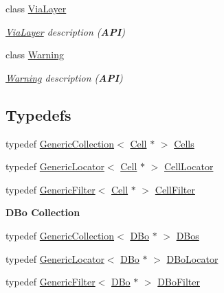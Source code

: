 \begin{DoxyCompactItemize}
class \mbox{\hyperlink{classHurricane_1_1ViaLayer}{Via\+Layer}}
\begin{DoxyCompactList}\small\item\em \mbox{\hyperlink{classHurricane_1_1ViaLayer}{Via\+Layer}} description ({\bfseries A\+PI}) \end{DoxyCompactList}\item 
class \mbox{\hyperlink{classHurricane_1_1Warning}{Warning}}
\begin{DoxyCompactList}\small\item\em \mbox{\hyperlink{classHurricane_1_1Warning}{Warning}} description ({\bfseries A\+PI}) \end{DoxyCompactList}\end{DoxyCompactItemize}
\subsection*{Typedefs}
\begin{DoxyCompactItemize}
\item 
typedef \mbox{\hyperlink{classHurricane_1_1GenericCollection}{Generic\+Collection}}$<$ \mbox{\hyperlink{classHurricane_1_1Cell}{Cell}} $\ast$ $>$ \mbox{\hyperlink{namespaceHurricane_a8b4ab14b26f36f43d83a50294410b44a}{Cells}}
\item 
typedef \mbox{\hyperlink{classHurricane_1_1GenericLocator}{Generic\+Locator}}$<$ \mbox{\hyperlink{classHurricane_1_1Cell}{Cell}} $\ast$ $>$ \mbox{\hyperlink{namespaceHurricane_abd99adab3b5944a4d1ace3d0b0b34f57}{Cell\+Locator}}
\item 
typedef \mbox{\hyperlink{classHurricane_1_1GenericFilter}{Generic\+Filter}}$<$ \mbox{\hyperlink{classHurricane_1_1Cell}{Cell}} $\ast$ $>$ \mbox{\hyperlink{namespaceHurricane_addb0e9cd376680ecea4966516694b799}{Cell\+Filter}}
\end{DoxyCompactItemize}
\begin{Indent}\textbf{ D\+Bo Collection}\par
\begin{DoxyCompactItemize}
\item 
typedef \mbox{\hyperlink{classHurricane_1_1GenericCollection}{Generic\+Collection}}$<$ \mbox{\hyperlink{classHurricane_1_1DBo}{D\+Bo}} $\ast$ $>$ \mbox{\hyperlink{namespaceHurricane_a0aa3882e095f9d425c253223d1c0793d}{D\+Bos}}
\item 
typedef \mbox{\hyperlink{classHurricane_1_1GenericLocator}{Generic\+Locator}}$<$ \mbox{\hyperlink{classHurricane_1_1DBo}{D\+Bo}} $\ast$ $>$ \mbox{\hyperlink{namespaceHurricane_a7d70ef7ad837859e453171feb692535c}{D\+Bo\+Locator}}
\item 
typedef \mbox{\hyperlink{classHurricane_1_1GenericFilter}{Generic\+Filter}}$<$ \mbox{\hyperlink{classHurricane_1_1DBo}{D\+Bo}} $\ast$ $>$ \mbox{\hyperlink{namespaceHurricane_a2af87173f0c45c5dc1f504d3ea2317d9}{D\+Bo\+Filter}}
\end{DoxyCompactItemize}
\end{Indent}
